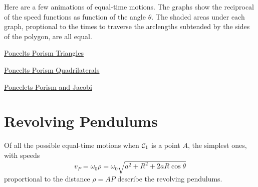 \documentclass{ximera}
\begin{document}
Here are a few animations of equal-time motions. The graphs show the reciprocal of the speed functions as function of the angle $\theta$. The shaded areas under each graph, proptional to the times to traverse the arclengths subtended by the sides of the polygon, are all equal.

\begin{exploration}

\begin{onlineOnly}
    \begin{center}
\end{center}
\end{onlineOnly}

\href{https://www.desmos.com/calculator/0aihemcv0o}{Poncelts Porism Triangles}

\end{exploration}


\begin{exploration}

\begin{onlineOnly}
    \begin{center}
\end{center}
\end{onlineOnly}

\href{https://www.desmos.com/calculator/pua4ogjcmr}{Poncelts Porism Quadrilaterals}


\end{exploration}


\begin{exploration}
\begin{onlineOnly}
    \begin{center}
\end{center}
\end{onlineOnly}

\href{https://www.desmos.com/calculator/lwbypn9rje}{Poncelets Porism and Jacobi}

\end{exploration}


\section*{Revolving Pendulums}
Of all the possible equal-time motions when ${\cal C}_1$ is a point $A$, the simplest ones, with speeds
\[
       v_P = \omega_0 \rho = \omega_0 \sqrt{a^2 + R^2 + 2aR\cos\theta} 
\]
proportional to the distance $\rho = AP$ describe the revolving pendulums.
\end{document}
